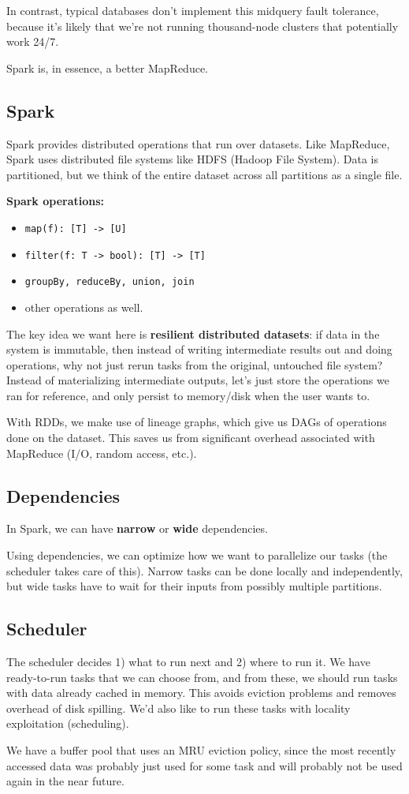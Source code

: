 \documentclass{article}
\begin{document}
In contrast, typical databases don't implement this midquery fault tolerance, because it's likely that we're not running thousand-node clusters that potentially work 24/7.

Spark is, in essence, a better MapReduce.

\subsection{Spark}

Spark provides distributed operations that run over datasets. Like MapReduce, Spark uses distributed file systems like HDFS (Hadoop File System). Data is partitioned, but we think of the entire dataset across all partitions as a single file.

\textbf{Spark operations:} \begin{itemize}
\item \verb|map(f): [T] -> [U]|
\item \verb|filter(f: T -> bool): [T] -> [T]|
\item \verb|groupBy, reduceBy, union, join|
\item other operations as well.
\end{itemize}

The key idea we want here is \textbf{resilient distributed datasets}: if data in the system is immutable, then instead of writing intermediate results out and doing operations, why not just rerun tasks from the original, untouched file system? Instead of materializing intermediate outputs, let's just store the operations we ran for reference, and only persist to memory/disk when the user wants to.

With RDDs, we make use of lineage graphs, which give us DAGs of operations done on the dataset. This saves us from significant overhead associated with MapReduce (I/O, random access, etc.).

\subsection{Dependencies} In Spark, we can have \textbf{narrow} or \textbf{wide} dependencies. 

Using dependencies, we can optimize how we want to parallelize our tasks (the scheduler takes care of this). Narrow tasks can be done locally and independently, but wide tasks have to wait for their inputs from possibly multiple partitions.

\subsection{Scheduler} The scheduler decides 1) what to run next and 2) where to run it. We have ready-to-run tasks that we can choose from, and from these, we should run tasks with data already cached in memory. This avoids eviction problems and removes overhead of disk spilling. We'd also like to run these tasks with locality exploitation (scheduling).

We have a buffer pool that uses an MRU eviction policy, since the most recently accessed data was probably just used for some task and will probably not be used again in the near future.
\end{document}
